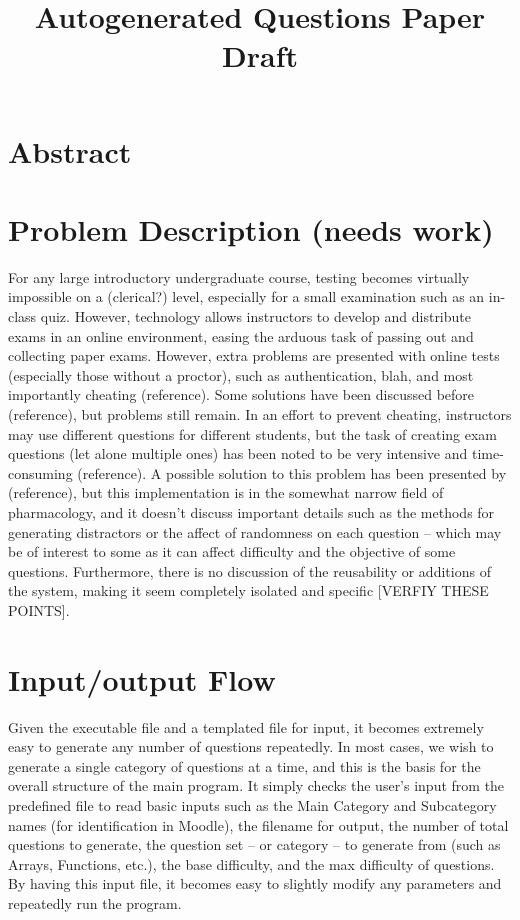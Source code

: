 \documentclass{article}
\title{Autogenerated Questions Paper Draft}
\date{ }
\begin{document}
\maketitle

\tableofcontents

\section{Abstract}

\section{Problem Description (needs work)}
For any large introductory undergraduate course, testing becomes virtually impossible on a (clerical?) level, especially for a small examination
such as an in-class quiz. However, technology allows instructors to develop and distribute exams in an online environment,
easing the arduous task of passing out and collecting paper exams. However, extra problems are presented with online tests (especially those
without a proctor), such as authentication, blah, and most importantly cheating (reference). Some solutions have been discussed before (reference),
but problems still remain. In an effort to prevent cheating, instructors may use different questions for different students, but the task of creating exam
questions (let alone multiple ones) has been noted to be very intensive and time-consuming (reference). A possible solution to this problem has been
presented by (reference), but this implementation is in the somewhat narrow field of pharmacology, and it doesn't discuss important details such as
the methods for generating distractors or the affect of randomness on each question -- which may be of interest to some as it can affect difficulty and
the objective of some questions. Furthermore, there is no discussion of the reusability or additions of the system, making it seem completely isolated
and specific [VERFIY THESE POINTS].


\section{Input/output Flow}

Given the executable file and a templated file for input, it becomes extremely easy to generate any number of questions
repeatedly. In most cases, we wish to generate a single category of questions at a time, and this is the basis for the
overall structure of the main program. It simply checks the user's input from the predefined file to read basic inputs
such as the Main Category and Subcategory names (for identification in Moodle), the filename for output, the number of
total questions to generate, the question set -- or category -- to generate from (such as Arrays, Functions, etc.),
the base difficulty, and the max difficulty of questions. By having this input file, it becomes easy to slightly modify
any parameters and repeatedly run the program.
\end{document}
